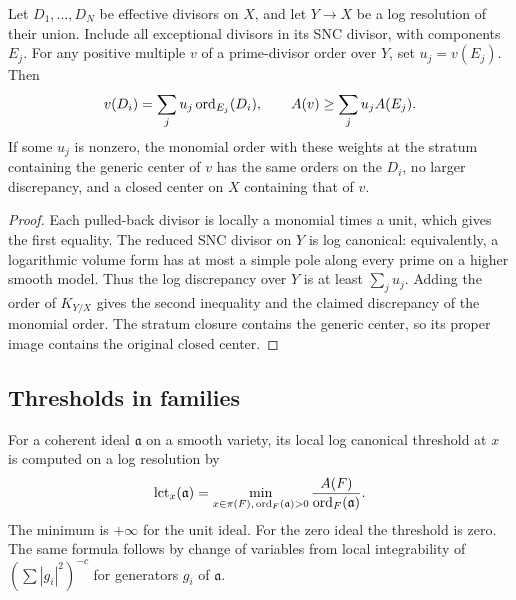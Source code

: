 \begin{lemma}\label{lem:retraction}
Let $D_1,\ldots,D_N$ be effective divisors on $X$, and let $Y\to X$ be a log resolution of their union. Include all exceptional divisors in its SNC divisor, with components $E_j$. For any positive multiple $v$ of a prime-divisor order over $Y$, set $u_j=v(E_j)$. Then
\begin{equation}\label{eq:retraction}
 v(D_i)=\sum_j u_j\operatorname{ord}_{E_j}(D_i),\qquad
 {A}(v)\geq\sum_j u_j{A}(E_j).
\end{equation}
If some $u_j$ is nonzero, the monomial order with these weights at the stratum containing the generic center of $v$ has the same orders on the $D_i$, no larger discrepancy, and a closed center on $X$ containing that of $v$.
\end{lemma}
\begin{proof}
Each pulled-back divisor is locally a monomial times a unit, which gives the first equality. The reduced SNC divisor on $Y$ is log canonical: equivalently, a logarithmic volume form has at most a simple pole along every prime on a higher smooth model. Thus the log discrepancy over $Y$ is at least $\sum_j u_j$. Adding the order of $K_{Y/X}$ gives the second inequality and the claimed discrepancy of the monomial order. The stratum closure contains the generic center, so its proper image contains the original closed center.
\end{proof}

\subsection{Thresholds in families}
For a coherent ideal $\mathfrak{a}$ on a smooth variety, its local log canonical threshold at $x$ is computed on a log resolution by
\begin{equation}\label{eq:lct-formula}
 \operatorname{lct}_x(\mathfrak{a})=
 \min_{x\in\pi(F),\,\operatorname{ord}_F(\mathfrak{a})>0}
       \frac{{A}(F)}{\operatorname{ord}_F(\mathfrak{a})}.
\end{equation}
The minimum is $+\infty$ for the unit ideal. For the zero ideal the threshold is zero. The same formula follows by change of variables from local integrability of $(\sum |g_i|^2)^{-c}$ for generators $g_i$ of $\mathfrak{a}$.

